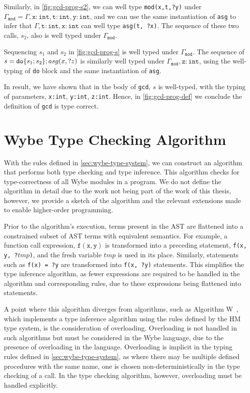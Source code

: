 Similarly, in \cref{fig:gcd-prog-s2}, we can well type \texttt{mod(x,t,?y)} under $\Gamma_{\mathtt{mod}}=\Gamma,\mathtt{x}:\mathtt{int},\mathtt{t}:\mathtt{int},\mathtt{y}:\mathtt{int}$, and we can use the same instantiation of \texttt{asg} to infer that $\Gamma,\mathtt{t}:\mathtt{int},\mathtt{x}:\mathtt{int}$ can well type \texttt{asg(t, ?x)}. The sequence of these two calls, $s_2$, also is well typed under $\Gamma_{\mathtt{mod}}$.

Sequencing $s_1$ and $s_2$ in \cref{fig:gcd-prog-s} is well typed under $\Gamma_{\mathtt{mod}}$. The sequence of $s = \mathtt{do}\lbrace s_1;s_2\rbrace;asg(x,?z)$ is similarly well typed under $\Gamma_{\mathtt{mod}},\mathtt{z}:\mathtt{int}$, using the well-typing of \texttt{do} block and the same instantiation of \texttt{asg}.

In result, we have shown that in the body of \texttt{gcd}, $s$ is well-typed, with the typing of parameters, \texttt{x:int}, \texttt{y:int}, \texttt{z:int}. Hence, in \cref{fig:gcd-prog-def} we conclude the definition of \texttt{gcd} is type correct.

\section{Wybe Type Checking Algorithm}

With the rules defined in \cref{sec:wybe-type-system}, we can construct an algorithm that performs both type checking and type inference. This algorithm checks for type-correctness of all Wybe modules in a program. We do not define the algorithm in detail due to the work not being part of the work of this thesis, however, we provide a sketch of the algorithm and the relevant extensions made to enable higher-order programming.

Prior to the algorithm's execution, terms present in the AST are flattened into a constrained subset of AST terms with equivalent semantics. For example, a function call expression, $\mathtt{f(x, y)}$ is transformed into a preceding statement, \texttt{f(x, y, ?$tmp$)}, and the fresh variable $tmp$ is used in its place. Similarly, statements such as \texttt{f(x) = ?y} are transformed into \texttt{f(x, ?y)} statements. This simplifies the type inference algorithm, as fewer expressions are required to be handled in the algorithm and corresponding rules, due to these expressions being flattened into statements.

A point where this algorithm diverges from algorithms, such as Algorithm W~\cite{damas1982principal}, which implements a type inference algorithm using the rules defined by the HM type system, is the consideration of overloading. Overloading is not handled in such algorithms but must be considered in the Wybe language, due to the presence of overloading in the language. Overloading is implicit in the typing rules defined in \cref{sec:wybe-type-system}, as where there may be multiple defined procedures with the same name, one is chosen non-deterministically in the type checking of a call. In the type checking algorithm, however, overloading must be handled explicitly.

